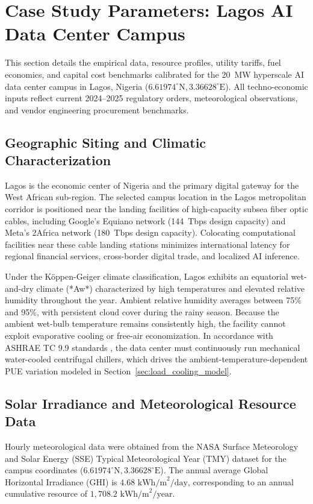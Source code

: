 \documentclass[11pt,a4paper]{article}
\begin{document}
\section{Case Study Parameters: Lagos AI Data Center Campus}
\label{sec:case}

This section details the empirical data, resource profiles, utility tariffs, fuel economics, and capital cost benchmarks calibrated for the 20~MW hyperscale AI data center campus in Lagos, Nigeria ($6.61974^\circ\text{N}, 3.36628^\circ\text{E}$). All techno-economic inputs reflect current 2024--2025 regulatory orders, meteorological observations, and vendor engineering procurement benchmarks.

\subsection{Geographic Siting and Climatic Characterization}
\label{sec:siting}
Lagos is the economic center of Nigeria and the primary digital gateway for the West African sub-region. The selected campus location in the Lagos metropolitan corridor is positioned near the landing facilities of high-capacity subsea fiber optic cables, including Google's Equiano network (144~Tbps design capacity) and Meta's 2Africa network (180~Tbps design capacity). Colocating computational facilities near these cable landing stations minimizes international latency for regional financial services, cross-border digital trade, and localized AI inference.

Under the Köppen-Geiger climate classification, Lagos exhibits an equatorial wet-and-dry climate (*Aw*) characterized by high temperatures and elevated relative humidity throughout the year. Ambient relative humidity averages between 75\% and 95\%, with persistent cloud cover during the rainy season. Because the ambient wet-bulb temperature remains consistently high, the facility cannot exploit evaporative cooling or free-air economization. In accordance with ASHRAE TC 9.9 standards \cite{ASHRAE2021}, the data center must continuously run mechanical water-cooled centrifugal chillers, which drives the ambient-temperature-dependent PUE variation modeled in Section~\ref{sec:load_cooling_model}.

\subsection{Solar Irradiance and Meteorological Resource Data}
\label{sec:solar_resource}
Hourly meteorological data were obtained from the NASA Surface Meteorology and Solar Energy (SSE) Typical Meteorological Year (TMY) dataset for the campus coordinates ($6.61974^\circ\text{N}, 3.36628^\circ\text{E}$). The annual average Global Horizontal Irradiance (GHI) is $4.68\text{ kWh/m}^2/\text{day}$, corresponding to an annual cumulative resource of $1,708.2\text{ kWh/m}^2/\text{year}$.
\end{document}
